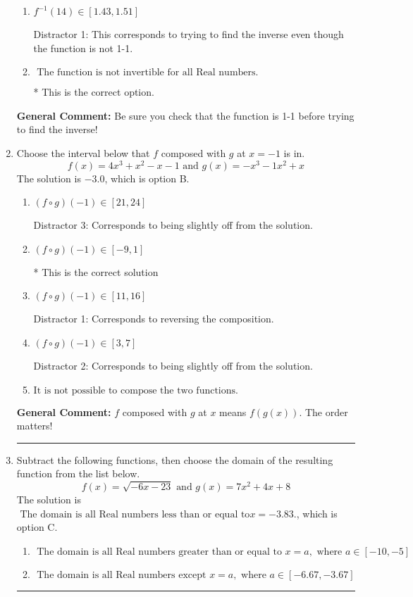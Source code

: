 \documentclass{extbook}[14pt]
\newcommand{\litem}[1]{\item #1

\rule{\textwidth}{0.4pt}}
\begin{document}
\begin{enumerate}
{\begin{enumerate}[label=\Alph*.]
 Distractor 2: This corresponds to finding the (nonexistent) inverse and not subtracting by the vertical shift.
\item \( f^{-1}(14) \in [1.43, 1.51] \)

 Distractor 1: This corresponds to trying to find the inverse even though the function is not 1-1. 
\item \( \text{ The function is not invertible for all Real numbers. } \)

* This is the correct option.
\end{enumerate}

\textbf{General Comment:} Be sure you check that the function is 1-1 before trying to find the inverse!
}
\litem{
Choose the interval below that $f$ composed with $g$ at $x=-1$ is in.
\[ f(x) = 4x^{3} + x^{2} -x -1 \text{ and } g(x) = -x^{3} -1 x^{2} +x \]The solution is \( -3.0 \), which is option B.\begin{enumerate}[label=\Alph*.]
\item \( (f \circ g)(-1) \in [21, 24] \)

 Distractor 3: Corresponds to being slightly off from the solution.
\item \( (f \circ g)(-1) \in [-9, 1] \)

* This is the correct solution
\item \( (f \circ g)(-1) \in [11, 16] \)

 Distractor 1: Corresponds to reversing the composition.
\item \( (f \circ g)(-1) \in [3, 7] \)

 Distractor 2: Corresponds to being slightly off from the solution.
\item \( \text{It is not possible to compose the two functions.} \)


\end{enumerate}

\textbf{General Comment:} $f$ composed with $g$ at $x$ means $f(g(x))$. The order matters!
}
\litem{
Subtract the following functions, then choose the domain of the resulting function from the list below.
\[ f(x) = \sqrt{-6x-23}  \text{ and } g(x) = 7x^{2} +4 x + 8 \]The solution is \( \text{ The domain is all Real numbers less than or equal to} x = -3.83. \), which is option C.\begin{enumerate}[label=\Alph*.]
\item \( \text{ The domain is all Real numbers greater than or equal to } x = a, \text{ where } a \in [-10, -5] \)


\item \( \text{ The domain is all Real numbers except } x = a, \text{ where } a \in [-6.67, -3.67] \)



\end{enumerate}}
\end{enumerate}
\end{document}
